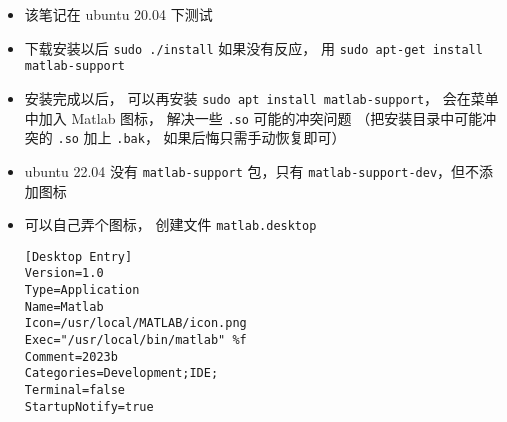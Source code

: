 
\begin{itemize}
\item 该笔记在 ubuntu 20.04 下测试
\item 下载安装以后 \verb`sudo ./install` 如果没有反应， 用 \verb`sudo apt-get install matlab-support`
\item 安装完成以后， 可以再安装 \verb`sudo apt install matlab-support`， 会在菜单中加入 Matlab 图标， 解决一些 \verb`.so` 可能的冲突问题 （把安装目录中可能冲突的 \verb`.so` 加上 \verb`.bak`， 如果后悔只需手动恢复即可）


\item ubuntu 22.04 没有 \verb`matlab-support` 包，只有 \verb`matlab-support-dev`，但不添加图标
\item 可以自己弄个图标， 创建文件 \verb`matlab.desktop`
\begin{lstlisting}[language=none]
[Desktop Entry]
Version=1.0
Type=Application
Name=Matlab
Icon=/usr/local/MATLAB/icon.png
Exec="/usr/local/bin/matlab" %f
Comment=2023b
Categories=Development;IDE;
Terminal=false
StartupNotify=true
\end{lstlisting}
\end{itemize}
